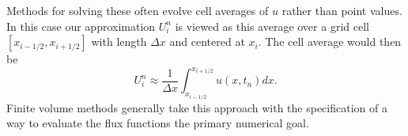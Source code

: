 \documentclass[11pt]{article}
\begin{document}
    Methods for solving these often evolve cell averages of \(u\) rather
than point values. In this case our approximation \(U^n_i\) is viewed as
this average over a grid cell \([x_{i-1/2}, x_{i+1/2}]\) with length
\(\Delta x\) and centered at \(x_i\). The cell average would then be \[
    U^n_i \approx \frac{1}{\Delta x} \int^{x_{i+1/2}}_{x_{i-1/2}} u(x, t_n) dx.
\] Finite volume methods generally take this approach with the
specification of a way to evaluate the flux functions the primary
numerical goal.


    
    
    
    
\end{document}
